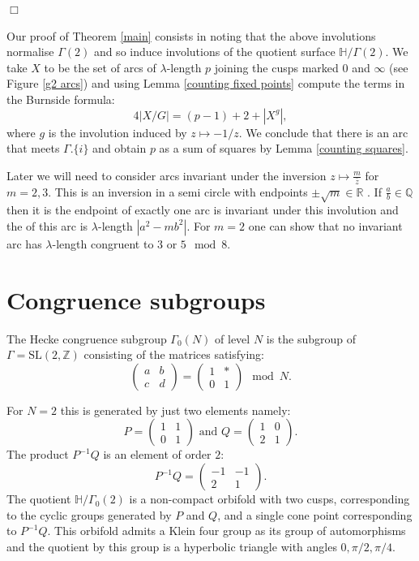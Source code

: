 \documentclass[12pt,a4paper]{amsart}
\def\HH{\mathbb{H}}
\def\oo{\HH / \Gamma_0(2)}
\def\g2{\Gamma(2)}
\def\xx{\HH/\g2}
\def\ZZ{\mathbb{Z}}
\begin{document}
\hfill $\Box$

Our proof  of Theorem \ref{main} consists in noting that the above involutions normalise $\g2$
and so induce involutions of the quotient surface $\xx$.
We take $X$ to be the set of arcs of $\lambda$-length $p$ joining
the cusps marked $0$ and $\infty$ (see Figure \ref{g2 arcs})
and using Lemma \ref{counting fixed points} compute the terms in the
Burnside formula:
$$
4 |X/G|   = (p-1) + 2 + |X^g|,$$
	where $g$ is the involution induced by $z\mapsto -1 /
	z.$
We conclude that there is an arc that meets $\Gamma.\{i\}$ and obtain
$p$ as a sum of squares by Lemma \ref{counting squares}.




Later we will need to consider arcs invariant under the inversion
$z\mapsto \frac{m}{\bar{z}}$ for $m=2,3$.
This is an inversion in a semi circle with endpoints $\pm \sqrt{m}
\in \mathbb{R}$ .
If $\frac{a}{b}\in \mathbb{Q}$ then it is the endpoint of exactly
one  arc is invariant under this involution and the
of this arc is $\lambda$-length $|a^2 - m b^2|$.
For $m=2$ one can show 
that no invariant arc has $\lambda$-length congruent to $3$ or $5 \mod 8$.



\section{Congruence subgroups}

The Hecke congruence subgroup $\Gamma_0(N)$ of level $N$ is the subgroup of
$\Gamma = \mathrm{SL}(2,\ZZ)$ 
consisting of the matrices satisfying:
$$ \begin{pmatrix} a & b \\ c & d \end{pmatrix} = 
\begin{pmatrix} 1 & * \\ 0 & 1 \end{pmatrix} \mod N.$$

For $N=2$ this is generated by just two elements namely:
$$ P = \begin{pmatrix} 1 & 1 \\ 0 & 1 \end{pmatrix} \text{ and } Q=  \begin{pmatrix} 1 & 0 \\ 2 & 1 \end{pmatrix}.$$
The product $P^{-1}Q$ is an element of order $2$:
$$ P^{-1}Q = \begin{pmatrix} -1 & -1 \\ 2 & 1 \end{pmatrix}.$$
The quotient $\oo$ is a non-compact orbifold with two cusps,
corresponding to the cyclic groups generated by $P$ and $Q$, and a
single cone point corresponding to $P^{-1}Q$.
This orbifold admits a Klein four group as its group of
automorphisms
and the quotient by this group is a hyperbolic triangle with angles
$0, \pi/2, \pi/4$.
\end{document}
